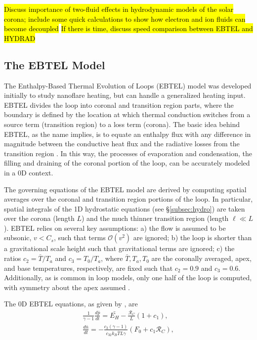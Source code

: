 %
\par\hl{Discuss importance of two-fluid effects in hydrodynamic models of the solar corona; include some quick calculations to show how electron and ion fluids can become decoupled}
\hl{If there is time, discuss speed comparison between EBTEL and HYDRAD}
%
\subsection{The EBTEL Model}
\label{subsec:ebtel}
%
\par The Enthalpy-Based Thermal Evolution of Loops (EBTEL) model \citep{klimchuk_highly_2008,cargill_enthalpy-based_2012} was developed initially to study nanoflare heating, but can handle a generalized heating input. EBTEL divides the loop into coronal and transition region parts, where the boundary is defined by the location at which thermal conduction switches from a source term (transition region) to a loss term (corona). The basic idea behind EBTEL, as the name implies, is to equate an enthalpy flux with any difference in magnitude between the conductive heat flux and the radiative losses from the transition region \citep{klimchuk_highly_2008}. In this way, the processes of evaporation and condensation, the filling and draining of the coronal portion of the loop, can be accurately modeled in a 0D context. 
%
\par The governing equations of the EBTEL model are derived by computing spatial averages over the coronal and transition region portions of the loop. In particular, spatial integrals of the 1D hydrostatic equations (see \S\ref{subsec:hydro}) are taken over the corona (length $L$) and the much thinner transition region (length $\ell\ll L$). EBTEL relies on several key assumptions: a) the flow is assumed to be subsonic, $v<C_s$, such that terms $\mathcal{O}(v^2)$ are ignored; b) the loop is shorter than a gravitational scale height such that gravitational terms are ignored; c) the ratios $c_2=\bar{T}/T_a$ and $c_3=T_0/T_a$, where $\bar{T},T_a,T_0$ are the coronally averaged, apex, and base temperatures, respectively, are fixed such that $c_2=0.9$ and $c_3=0.6$. Additionally, as is common in loop models, only one half of the loop is computed, with symmetry about the apex assumed \citep{klimchuk_highly_2008}.
%
\par The 0D EBTEL equations, as given by \citet{cargill_enthalpy-based_2012}, are
\begin{align}
	\frac{1}{\gamma - 1}\frac{d\bar{p}}{dt} = \bar{E_H} - \frac{\mathcal{R}_C}{L}(1+c_1), \label{eq:ebtel_sf_pressure} \\[0.5em]
	\frac{d\bar{n}}{dt} = -\frac{c_2(\gamma - 1)}{c_32k_B\bar{T}L\gamma}(F_0 + c_1\mathcal{R}_C), \label{eq:ebtel_sf_density}
\end{align}
